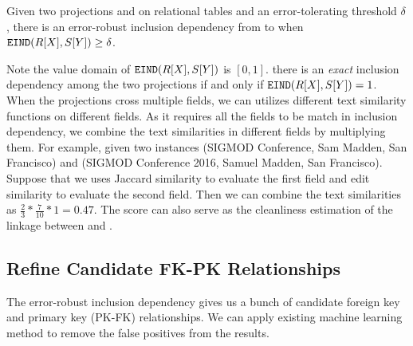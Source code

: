 \begin{definition}
Given two projections \RX and \SY on relational tables and an error-tolerating threshold $\delta$, there is an error-robust inclusion dependency from \X to \Y when $\texttt{EIND}(R[X],S[Y])\geq\delta$.
\end{definition}

\iffalse
\dong{To add an example here.}
\fi


Note the value domain of $\texttt{EIND}(R[X],S[Y])$ is $[0,1]$. there is an \emph{exact} inclusion dependency among the two projections if and only if $\texttt{EIND}(R[X],S[Y])=1$. When the projections cross multiple fields, we can utilizes different text similarity functions on different fields. As it requires all the fields to be match in inclusion dependency, we combine the text similarities in different fields by multiplying them. For example, given two instances \textsf{(SIGMOD Conference, Sam Madden, San Francisco)} and \textsf{(SIGMOD Conference 2016, Samuel Madden, San Francisco)}. Suppose that we uses Jaccard similarity to evaluate the first field and edit similarity to evaluate the second field. Then we can combine the text similarities as $\frac{2}{3}*\frac{7}{10}*1=0.47$. The score \EIND can also serve as the cleanliness estimation of the linkage between \RX and \SY	.

\subsection{Refine Candidate FK-PK Relationships}

The error-robust inclusion dependency gives us a bunch of candidate foreign key and primary key (PK-FK) relationships. We can apply existing machine learning method to remove the false positives from the results. 




\iffalse
\subsection{Query the Join Graph}\label{subsec:query}

Once the join graph is constructed, the users can query it in various way. Among them, one of the most important one is to.

The essential way to query the join graph is taking several vertexes and find an subgraph containing all the query vertexes.

The user can specify several attributes which compose a \emph{query schema}. 

Given a collection of attributes, we aim to find a subgraph that contains all the corresponding vertexes. 

\fi